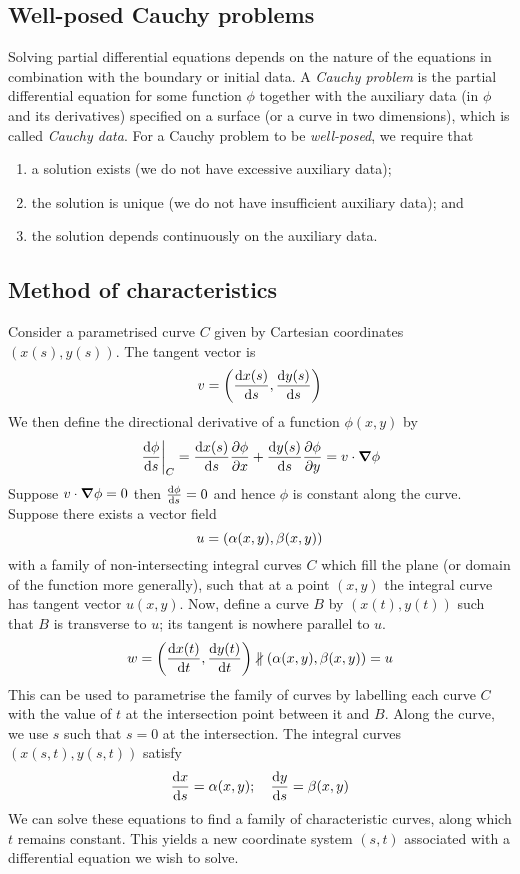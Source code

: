 \subsection{Well-posed Cauchy problems}
Solving partial differential equations depends on the nature of the equations in combination with the boundary or initial data.
A \textit{Cauchy problem} is the partial differential equation for some function \( \phi \) together with the auxiliary data (in \( \phi \) and its derivatives) specified on a surface (or a curve in two dimensions), which is called \textit{Cauchy data}.
For a Cauchy problem to be \textit{well-posed}, we require that
\begin{enumerate}
	\item a solution exists (we do not have excessive auxiliary data);
	\item the solution is unique (we do not have insufficient auxiliary data); and
	\item the solution depends continuously on the auxiliary data.
\end{enumerate}

\subsection{Method of characteristics}
Consider a parametrised curve \( C \) given by Cartesian coordinates \( (x(s), y(s)) \).
The tangent vector is
\[
	v = \qty(\dv{x(s)}{s}, \dv{y(s)}{s})
\]
We then define the directional derivative of a function \( \phi(x,y) \) by
\[
	\eval{\dv{\phi}{s}}_C = \dv{x(s)}{s} \pdv{\phi}{x} + \dv{y(s)}{s}\pdv{\phi}{y} = v \cdot \grad{\phi}
\]
Suppose \( v \cdot \grad{\phi} = 0 \) then \( \dv{\phi}{s} = 0 \) and hence \( \phi \) is constant along the curve.
Suppose there exists a vector field
\[
	u = \qty(\alpha(x,y), \beta(x,y))
\]
with a family of non-intersecting integral curves \( C \) which fill the plane (or domain of the function more generally), such that at a point \( (x,y) \) the integral curve has tangent vector \( u(x,y) \).
Now, define a curve \( B \) by \( (x(t), y(t)) \) such that \( B \) is transverse to \( u \); its tangent is nowhere parallel to \( u \).
\[
	w = \qty(\dv{x(t)}{t}, \dv{y(t)}{t}) \nparallel \qty(\alpha(x,y), \beta(x,y)) = u
\]
This can be used to parametrise the family of curves by labelling each curve \( C \) with the value of \( t \) at the intersection point between it and \( B \).
Along the curve, we use \( s \) such that \( s = 0 \) at the intersection.
The integral curves \( (x(s,t), y(s,t)) \) satisfy
\[
	\dv{x}{s} = \alpha(x,y);\quad \dv{y}{s} = \beta(x,y)
\]
We can solve these equations to find a family of characteristic curves, along which \( t \) remains constant.
This yields a new coordinate system \( (s,t) \) associated with a differential equation we wish to solve.

